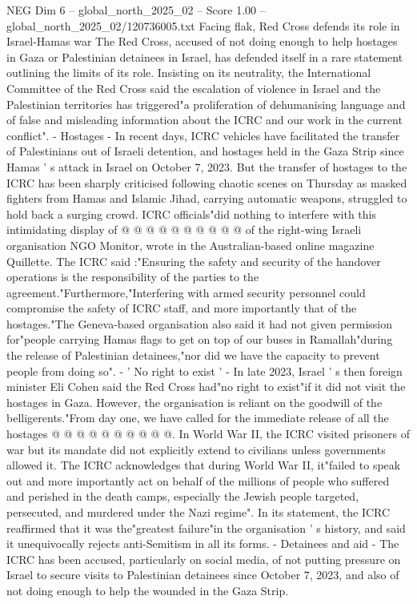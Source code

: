 \begin{textsample}{NEG Dim 6 – global\_north\_2025\_02 – Score 1.00 – global\_north\_2025\_02/120736005.txt}  \label{ex:f6_neg_082}
Facing flak, Red Cross defends its role in Israel-Hamas war The Red Cross, accused of not doing enough to help hostages in Gaza or Palestinian detainees in Israel, has defended itself in a rare statement outlining the limits of its role.
Insisting on its neutrality, the International Committee of the Red Cross said the escalation of violence in Israel and the Palestinian territories has triggered"a proliferation of dehumanising language and of false and misleading information about the ICRC and our work in the current conflict". - Hostages - In recent days, ICRC vehicles have facilitated the transfer of Palestinians out of Israeli detention, and hostages held in the Gaza Strip since Hamas ' s attack in Israel on October 7, 2023.
But the transfer of hostages to the ICRC has been sharply criticised following chaotic scenes on Thursday as masked fighters from Hamas and Islamic Jihad, carrying automatic weapons, struggled to hold back a surging crowd.
ICRC officials"did nothing to interfere with this intimidating display of @ @ @ @ @ @ @ @ @ @ of the right-wing Israeli organisation NGO Monitor, wrote in the Australian-based online magazine Quillette.
The ICRC said :"Ensuring the safety and security of the handover operations is the responsibility of the parties to the agreement."Furthermore,"Interfering with armed security personnel could compromise the safety of ICRC staff, and more importantly that of the hostages."The Geneva-based organisation also said it had not given permission for"people carrying Hamas flags to get on top of our buses in Ramallah"during the release of Palestinian detainees,"nor did we have the capacity to prevent people from doing so". - ' No right to exist ' - In late 2023, Israel ' s then foreign minister Eli Cohen said the Red Cross had"no right to exist"if it did not visit the hostages in Gaza.
However, the organisation is reliant on the goodwill of the belligerents."From day one, we have called for the immediate release of all the hostages @ @ @ @ @ @ @ @ @ @.
In World War II, the ICRC visited prisoners of war but its mandate did not explicitly extend to civilians unless governments allowed it.
The ICRC acknowledges that during World War II, it"failed to speak out and more importantly act on behalf of the millions of people who suffered and perished in the death camps, especially the Jewish people targeted, persecuted, and murdered under the Nazi regime".
In its statement, the ICRC reaffirmed that it was the"greatest failure"in the organisation ' s history, and said it unequivocally rejects anti-Semitism in all its forms. - Detainees and aid - The ICRC has been accused, particularly on social media, of not putting pressure on Israel to secure visits to Palestinian detainees since October 7, 2023, and also of not doing enough to help the wounded in the Gaza Strip.

\end{textsample}

